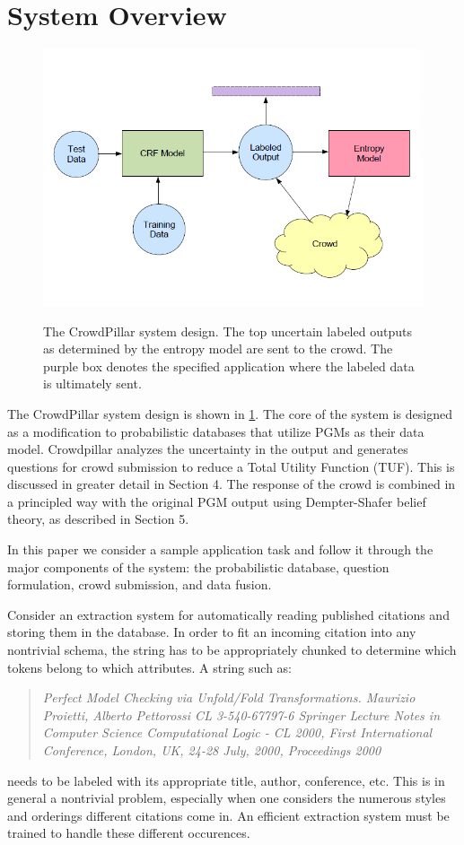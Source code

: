 \section{System Overview}
\begin{figure}
\centering
\includegraphics[width=0.5\linewidth]{images/system_design.png}
\label{fig:system_design}
\caption[example]{The CrowdPillar system design.  The top uncertain labeled outputs as determined by the entropy model are sent to the crowd.  The purple box denotes the specified application where the labeled data is ultimately sent.}
\end{figure}

The CrowdPillar system design is shown in \ref{fig:system_design}. The core of the system is designed as a modification to probabilistic databases that utilize PGMs as their data model.  Crowdpillar analyzes the uncertainty in the output and generates questions for crowd submission to reduce a Total Utility Function (TUF).  This is discussed in greater detail in Section 4.  The response of the crowd is combined in a principled way with the original PGM output using Dempter-Shafer belief theory, as described in Section 5.

In this paper we consider a sample application task and follow it through the major components of the system: the probabilistic database, question formulation, crowd submission, and data fusion.

Consider an extraction system for automatically reading published citations and storing them in the database.  In order to fit an incoming citation into any nontrivial schema, the string has to be appropriately chunked to determine which tokens belong to which attributes.  A string such as:
\begin{quotation}
\textit{Perfect Model Checking via Unfold/Fold Transformations. Maurizio Proietti, Alberto Pettorossi CL 3-540-67797-6 Springer Lecture Notes in Computer Science Computational Logic - CL 2000, First International Conference, London, UK, 24-28 July, 2000, Proceedings 2000}
\end{quotation}
needs to be labeled with its appropriate title, author, conference, etc.  This is in general a nontrivial problem, especially when one considers the numerous styles and orderings different citations come in.  An efficient extraction system must be trained to handle these different occurences.

